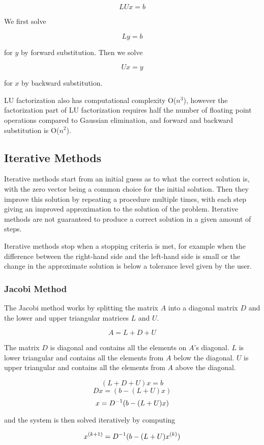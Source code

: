 $$LUx = b$$

We first solve 

$$Ly = b$$

for $y$ by forward substitution. Then we solve 

$$Ux = y$$

for $x$ by backward substitution.

LU factorization also has computational complexity O($n^3$), however the factorization part of 
LU factorization requires half the number of floating point operations compared to Gaussian elimination, 
and forward and backward substitution is O($n^2$)\cite{Kreyszig}.

\subsection{Iterative Methods}

Iterative methods start from an initial guess as to what the correct solution is, 
with the zero vector being a common choice for the initial solution. Then they improve 
this solution by repeating a procedure multiple times, with each step 
giving an improved approximation to the solution of the problem. Iterative methods 
are not guaranteed to produce a correct solution in a given amount of steps. 

Iterative methods stop when a stopping criteria is met, for example when the difference 
between the right-hand side and the left-hand side is small or the change in the approximate 
solution is below a tolerance level given by the user. 

\subsubsection{Jacobi Method}

The Jacobi method works by splitting the matrix $A$ into a diagonal matrix $D$ 
and the lower and upper triangular matrices $L$ and $U$. 

$$A = L+D+U$$

The matrix $D$ is diagonal and contains all the elements on $A$'s diagonal. $L$ 
is lower triangular and contains all the elements from $A$ below the diagonal. 
$U$ is upper triangular and contains all the elements from $A$ above the diagonal.

$$(L+D+U)x = b$$
$$Dx = (b - (L+U)x)$$
$$x = {D}^{-1}(b - (L+U)x)$$

and the system is then solved iteratively by computing 

$$x^{(k+1)} = {D}^{-1}(b - (L+U)x^{(k)})$$

